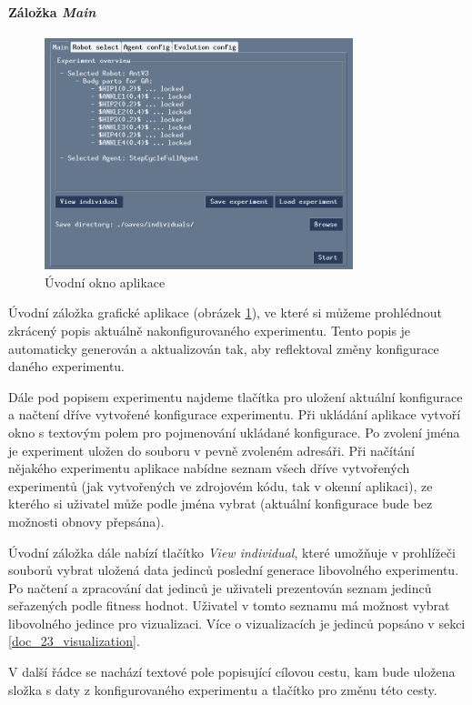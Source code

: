 \paragraph{Záložka \emph{Main}}
\begin{figure}[!htb]
    \centering
    \includegraphics[width=0.8\textwidth]{../img/GUI_main_tab.jpg}
    \caption{Úvodní okno aplikace}
    \label{doc_12_fig:GUI_main}
\end{figure}
Úvodní záložka grafické aplikace (obrázek \ref{doc_12_fig:GUI_main}), ve které
si můžeme prohlédnout zkrácený popis aktuálně nakonfigurovaného experimentu.
Tento popis je automaticky generován a aktualizován tak, aby reflektoval změny
konfigurace daného experimentu. 

Dále pod popisem experimentu najdeme tlačítka pro uložení aktuální konfigurace
a načtení dříve vytvořené konfigurace experimentu. Při ukládání aplikace
vytvoří okno s textovým polem pro pojmenování ukládané konfigurace. Po zvolení
jména je experiment uložen do souboru v pevně zvoleném adresáři. Při načítání
nějakého experimentu aplikace nabídne seznam všech dříve vytvořených
experimentů (jak vytvořených ve zdrojovém kódu, tak v okenní aplikaci), ze
kterého si uživatel může podle jména vybrat (aktuální konfigurace bude bez
možnosti obnovy přepsána).

Úvodní záložka dále nabízí tlačítko \emph{View individual}, které umožňuje v
prohlížeči souborů vybrat uložená data jedinců poslední generace libovolného
experimentu. Po načtení a zpracování dat jedinců je uživateli prezentován
seznam jedinců seřazených podle fitness hodnot. Uživatel v tomto seznamu má
možnost vybrat libovolného jedince pro vizualizaci. Více o vizualizacích
je jedinců popsáno v sekci \ref{doc_23_visualization}.

V další řádce se nachází textové pole popisující cílovou cestu, kam bude
uložena složka s daty z konfigurovaného experimentu a tlačítko pro změnu této
cesty.

